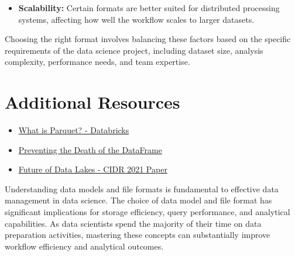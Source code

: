 \documentclass[12pt]{article}
\begin{document}
\begin{enumerate}
\begin{tcolorbox}[colback=blue!5!white,colframe=blue!75!black,title=Solution]
\begin{itemize}
        \item \textbf{Scalability:} Certain formats are better suited for distributed processing systems, affecting how well the workflow scales to larger datasets.
    \end{itemize}
    
    Choosing the right format involves balancing these factors based on the specific requirements of the data science project, including dataset size, analysis complexity, performance needs, and team expertise.
    \end{tcolorbox}
\end{enumerate}

\section{Additional Resources}

\begin{itemize}
    \item \href{https://databricks.com/glossary/what-is-parquet}{What is Parquet? - Databricks}
    \item \href{https://towardsdatascience.com/preventing-the-death-of-the-dataframe-8bca1c0f83c8}{Preventing the Death of the DataFrame}
    \item \href{http://cidrdb.org/cidr2021/papers/cidr2021_paper17.pdf}{Future of Data Lakes - CIDR 2021 Paper}
\end{itemize}

\begin{tcolorbox}[colback=red!5!white,colframe=red!75!black,title=Key Takeaway]
Understanding data models and file formats is fundamental to effective data management in data science. The choice of data model and file format has significant implications for storage efficiency, query performance, and analytical capabilities. As data scientists spend the majority of their time on data preparation activities, mastering these concepts can substantially improve workflow efficiency and analytical outcomes.
\end{tcolorbox}
\end{document}
